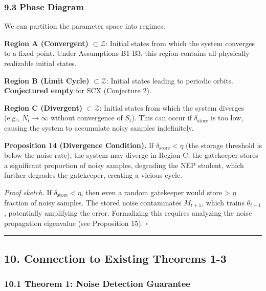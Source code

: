 \documentclass[
  12pt,
]{ctexart}
\begin{document}
\subsubsection{9.3 Phase Diagram}\label{phase-diagram}

We can partition the parameter space into regimes:

\textbf{Region A (Convergent)} \(\subset \mathcal{Z}\): Initial states
from which the system converges to a fixed point. Under Assumptions
B1-B3, this region contains all physically realizable initial states.

\textbf{Region B (Limit Cycle)} \(\subset \mathcal{Z}\): Initial states
leading to periodic orbits. \textbf{Conjectured empty} for SCX
(Conjecture 2).

\textbf{Region C (Divergent)} \(\subset \mathcal{Z}\): Initial states
from which the system diverges (e.g., \(N_t \to \infty\) without
convergence of \(S_t\)). This can occur if \(\delta_{\text{store}}\) is
too low, causing the system to accumulate noisy samples indefinitely.

\textbf{Proposition 14 (Divergence Condition).} If
\(\delta_{\text{store}} < \eta\) (the storage threshold is below the
noise rate), the system may diverge in Region C: the gatekeeper stores a
significant proportion of noisy samples, degrading the NEP student,
which further degrades the gatekeeper, creating a vicious cycle.

\emph{Proof sketch.} If \(\delta_{\text{store}} < \eta\), then even a
random gatekeeper would store \textgreater{} \(\eta\) fraction of noisy
samples. The stored noise contaminates \(M_{t+1}\), which trains
\(\theta_{t+1}\), potentially amplifying the error. Formalizing this
requires analyzing the noise propagation eigenvalue (see Proposition
15). \(\square\)

\begin{center}\rule{0.5\linewidth}{0.5pt}\end{center}

\subsection{10. Connection to Existing Theorems
1-3}\label{connection-to-existing-theorems-1-3}

\subsubsection{10.1 Theorem 1: Noise Detection
Guarantee}\label{theorem-1-noise-detection-guarantee}
\end{document}
